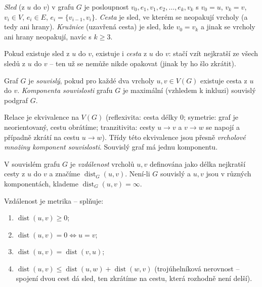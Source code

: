 \documentclass[11pt,a4paper]{article}
\DeclareMathOperator{\dist}{dist}
\begin{document}
\begin{definice}
\emph{Sled} (z $u$ do $v$) v grafu $G$ je posloupnost $v_0,e_1,v_1,e_2,\dots,e_k,v_k$ s $v_0=u$, $v_k=v$, $v_i\in V$, $e_i\in E$, $e_i=\{v_{i-1},v_i\}$. \emph{Cesta} je sled, ve kterém se neopakují vrcholy (a tedy ani hrany). \emph{Kružnice} (uzavřená cesta) je sled, kde $v_0=v_k$ a jinak se vrcholy ani hrany neopakují, navíc s $k\ge 3$.
\end{definice}

\begin{poznamka}
Pokud existuje sled z $u$ do $v$, existuje i \emph{cesta} z $u$ do $v$: stačí vzít nejkratší ze všech sledů z $u$ do $v$ -- ten už se nemůže nikde opakovat (jinak by ho šlo zkrátit).
\end{poznamka}

\begin{definice}
Graf $G$ je \emph{souvislý}, pokud pro každé dva vrcholy $u,v\in V(G)$ existuje cesta z $u$ do $v$. \emph{Komponenta souvislosti} grafu $G$ je maximální (vzhledem k inkluzi) souvislý podgraf $G$.
\end{definice}

\begin{intuice}
Relace  je ekvivalence na $V(G)$ (reflexivita: cesta délky 0; symetrie: graf je neorientovaný, cestu obrátíme; tranzitivita: cesty $u\to v$ a $v\to w$ se napojí a případně zkrátí na cestu $u\to w$). Třídy této ekvivalence jsou přesně \emph{vrcholové množiny komponent souvislosti}. Souvislý graf má jednu komponentu.
\end{intuice}

\begin{definice}
V souvislém grafu $G$ je \emph{vzdálenost} vrcholů $u,v$ definována jako délka nejkratší cesty z $u$ do $v$ a značíme $\dist_G(u,v)$. Není-li $G$ souvislý a $u,v$ jsou v různých komponentách, klademe $\dist_G(u,v)=\infty$.
\end{definice}

\begin{poznamka}
Vzdálenost je metrika -- splňuje:
\begin{enumerate}[label=(\arabic*)]
  \item $\dist(u,v)\ge 0$;
  \item $\dist(u,v)=0\iff u=v$;
  \item $\dist(u,v)=\dist(v,u)$;
  \item $\dist(u,v)\le\dist(u,w)+\dist(w,v)$ (trojúhelníková nerovnost -- spojení dvou cest dá sled, ten zkrátíme na cestu, která rozhodně není delší).
\end{enumerate}
\end{poznamka}
\end{document}
